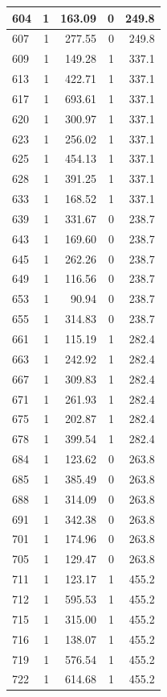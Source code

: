 \documentclass[
  spanish,
  12pt,
]{book}
\begin{document}
\begin{tabular}{l|r|r|r|r}
\hline
604 & 1 & 163.09 & 0 & 249.8\\
\hline
607 & 1 & 277.55 & 0 & 249.8\\
\hline
609 & 1 & 149.28 & 1 & 337.1\\
\hline
613 & 1 & 422.71 & 1 & 337.1\\
\hline
617 & 1 & 693.61 & 1 & 337.1\\
\hline
620 & 1 & 300.97 & 1 & 337.1\\
\hline
623 & 1 & 256.02 & 1 & 337.1\\
\hline
625 & 1 & 454.13 & 1 & 337.1\\
\hline
628 & 1 & 391.25 & 1 & 337.1\\
\hline
633 & 1 & 168.52 & 1 & 337.1\\
\hline
639 & 1 & 331.67 & 0 & 238.7\\
\hline
643 & 1 & 169.60 & 0 & 238.7\\
\hline
645 & 1 & 262.26 & 0 & 238.7\\
\hline
649 & 1 & 116.56 & 0 & 238.7\\
\hline
653 & 1 & 90.94 & 0 & 238.7\\
\hline
655 & 1 & 314.83 & 0 & 238.7\\
\hline
661 & 1 & 115.19 & 1 & 282.4\\
\hline
663 & 1 & 242.92 & 1 & 282.4\\
\hline
667 & 1 & 309.83 & 1 & 282.4\\
\hline
671 & 1 & 261.93 & 1 & 282.4\\
\hline
675 & 1 & 202.87 & 1 & 282.4\\
\hline
678 & 1 & 399.54 & 1 & 282.4\\
\hline
684 & 1 & 123.62 & 0 & 263.8\\
\hline
685 & 1 & 385.49 & 0 & 263.8\\
\hline
688 & 1 & 314.09 & 0 & 263.8\\
\hline
691 & 1 & 342.38 & 0 & 263.8\\
\hline
701 & 1 & 174.96 & 0 & 263.8\\
\hline
705 & 1 & 129.47 & 0 & 263.8\\
\hline
711 & 1 & 123.17 & 1 & 455.2\\
\hline
712 & 1 & 595.53 & 1 & 455.2\\
\hline
715 & 1 & 315.00 & 1 & 455.2\\
\hline
716 & 1 & 138.07 & 1 & 455.2\\
\hline
719 & 1 & 576.54 & 1 & 455.2\\
\hline
722 & 1 & 614.68 & 1 & 455.2\\

\end{tabular}
\end{document}
